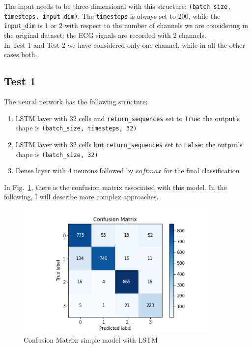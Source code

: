 \documentclass[LaM,binding=0.6cm]{sapthesis}
\begin{document}
The input needs to be three-dimensional with this structure: \texttt{(batch\_size, timesteps, input\_dim)}. The \texttt{timesteps} is always set to 200, while the \texttt{input\_dim} is 1 or 2 with respect to the number of channels we are considering in the original dataset: the ECG signals are recorded with 2 channels.\\In Test 1 and Test 2 we have considered only one channel, while in all the other cases both.
\subsection{Test 1}
The neural network has the following structure:
\begin{enumerate}
\item LSTM layer with 32 cells and \texttt{return\_sequences} set to \texttt{True}: the output's shape is \texttt{(batch\_size, timesteps, 32)} 
\item LSTM layer with 32 cells but \texttt{return\_sequences} set to \texttt{False}: the output's shape is \texttt{(batch\_size, 32)} 
\item Dense layer with 4 neurons followed by $softmax$ for the final classification
\end{enumerate}
In Fig.~\ref{fig:lstmt1}, there is the confusion matrix associated with this model. In the following, I will describe more complex approaches.
\begin{figure}[H]  \centering
    \includegraphics[width=100mm,scale=0.7]{lstmt1}
    \caption{Confusion Matrix: simple model with LSTM}
    \label{fig:lstmt1}
\end{figure}
\end{document}
